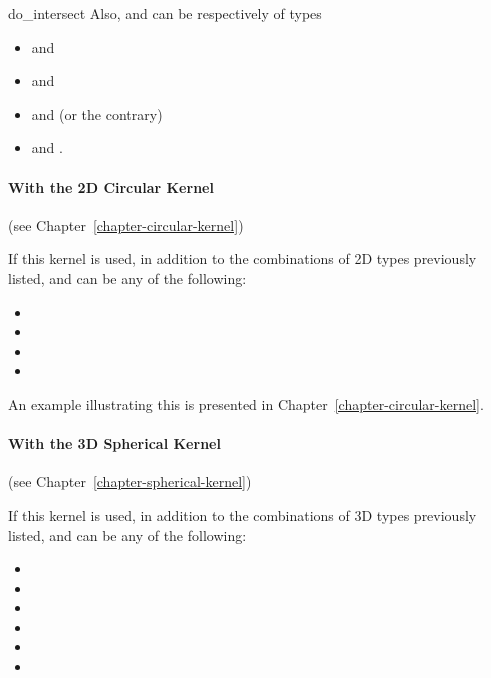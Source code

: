 \begin{ccRefFunction}{do_intersect}
Also,  and  can be respectively of types
\begin{itemize}
\item {} and 
\item {} and 
\item {} and  (or the contrary)
\item {} and .
\end{itemize} 

\paragraph{With the 2D Circular Kernel} (see Chapter~\ref{chapter-circular-kernel}) 


If this kernel is used, in addition to the combinations of 2D types
previously listed,  and  can be any of
the following:
\begin{itemize}
\item {}
\item {}
\item {}
\item {}
\end{itemize}

An example illustrating this is presented in
Chapter~\ref{chapter-circular-kernel}.

\paragraph{With the 3D Spherical Kernel} (see Chapter~\ref{chapter-spherical-kernel}) 


If this kernel is used, in addition to the combinations of 3D types
previously listed,  and  can be any of
the following:
\begin{itemize}
\item {}
\item {}
\item {}
\item {}
\item {}
\item {}
\end{itemize}


\end{ccRefFunction}
